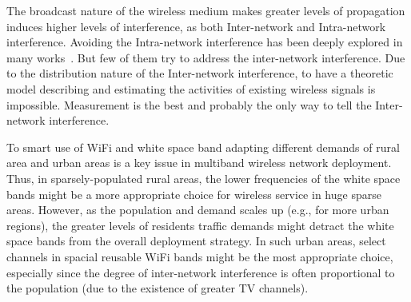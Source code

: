  The broadcast nature of the wireless 
 medium makes greater levels of propagation induces higher levels of interference, 
 as both Inter-network and Intra-network interference. 
Avoiding the Intra-network interference has been deeply explored in 
many works~\cite{subramanian2008minimum,ramachandran2006interference,si2010overview}.
But few of them try to address the inter-network interference.
Due to the distribution nature of the Inter-network interference,
to have a theoretic model describing and estimating the activities of existing
 wireless signals is impossible. Measurement is the best and probably the only way 
 to tell the Inter-network interference. 




To smart use of WiFi and white space band adapting different 
demands of rural area and urban areas is a key issue in 
multiband wireless network deployment. 
Thus, in sparsely-populated rural areas, the lower frequencies of the white space 
bands might be a more appropriate choice for wireless service in huge sparse areas. 
However, as the population and demand scales up (e.g., 
for more urban regions), the greater levels of residents traffic demands 
might detract the white space bands from the 
overall deployment strategy. In such urban areas, select channels in 
spacial reusable WiFi bands might be the most appropriate choice, 
especially since the degree of inter-network interference is often  
proportional to the population (due to the existence of greater TV channels).

